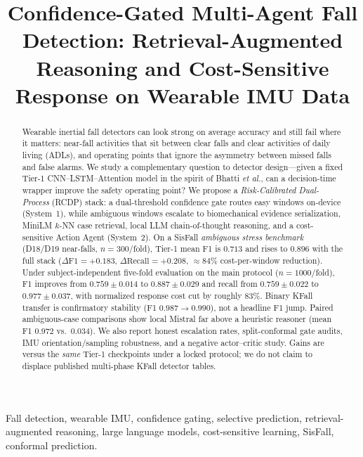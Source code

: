 \documentclass[journal]{IEEEtran}
\begin{document}
\title{Confidence-Gated Multi-Agent Fall Detection: Retrieval-Augmented Reasoning and Cost-Sensitive Response on Wearable IMU Data}

\author{%
}

\maketitle

\begin{abstract}
Wearable inertial fall detectors can look strong on average accuracy and still fail where it matters: near-fall activities that sit between clear falls and clear activities of daily living (ADLs), and operating points that ignore the asymmetry between missed falls and false alarms. We study a complementary question to detector design---given a fixed Tier-1 CNN--LSTM--Attention model in the spirit of Bhatti \textit{et al.}, can a decision-time wrapper improve the safety operating point? We propose a \emph{Risk-Calibrated Dual-Process} (RCDP) stack: a dual-threshold confidence gate routes easy windows on-device (System~1), while ambiguous windows escalate to biomechanical evidence serialization, MiniLM $k$-NN case retrieval, local LLM chain-of-thought reasoning, and a cost-sensitive Action Agent (System~2). On a SisFall \emph{ambiguous stress benchmark} (D18/D19 near-falls, $n{=}300$/fold), Tier-1 mean F1 is $0.713$ and rises to $0.896$ with the full stack ($\Delta\text{F1}{=}+0.183$, $\Delta\text{Recall}{=}+0.208$, $\approx 84\%$ cost-per-window reduction). Under subject-independent five-fold evaluation on the main protocol ($n{=}1000$/fold), F1 improves from $0.759{\pm}0.014$ to $0.887{\pm}0.029$ and recall from $0.759{\pm}0.022$ to $0.977{\pm}0.037$, with normalized response cost cut by roughly $83\%$. Binary KFall transfer is confirmatory stability (F1 $0.987{\rightarrow}0.990$), not a headline F1 jump. Paired ambiguous-case comparisons show local Mistral far above a heuristic reasoner (mean F1 $0.972$ vs.\ $0.034$). We also report honest escalation rates, split-conformal gate audits, IMU orientation/sampling robustness, and a negative actor--critic study. Gains are versus the \emph{same} Tier-1 checkpoints under a locked protocol; we do not claim to displace published multi-phase KFall detector tables.
\end{abstract}

\begin{IEEEkeywords}
Fall detection, wearable IMU, confidence gating, selective prediction, retrieval-augmented reasoning, large language models, cost-sensitive learning, SisFall, conformal prediction.
\end{IEEEkeywords}
\end{document}
